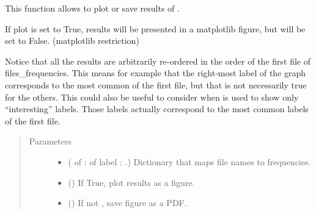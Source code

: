 \documentclass[letterpaper,10pt,english]{sphinxmanual}
\begin{document}
\begin{fulllineitems}
\label{\detokenize{utils:loacore.utils.plot_frequencies.frequencies_bar_chart}}
This function allows to plot or save results of {\hyperref[\detokenize{analysis:module-loacore.analysis.frequencies}]{}}.

If plot is set to True, results will be presented in a matplotlib figure, but  will be set to False.
(matplotlib restriction)

Notice that all the results are arbitrarily re-ordered in the order of the first file of files\_frequencies. This
means for example that the right-most label of the graph corresponds to the most common of the first file, but that
is not necessarily true for the others. This could also be useful to consider when  is used to show only
“interesting” labels. Those labels actually correspond to the  most common labels of the first file.
\begin{quote}\begin{description}
\item[{Parameters}] \leavevmode\begin{itemize}
\item {} 
 ( of  :  of label :  .) \textendash{} Dictionary that maps file names to frequencies.

\item {} 
 () \textendash{} If True, plot results as a figure.

\item {} 
 () \textendash{} If not , save figure as a PDF.


\end{itemize}
\end{description}
\end{quote}
\end{fulllineitems}
\end{document}
